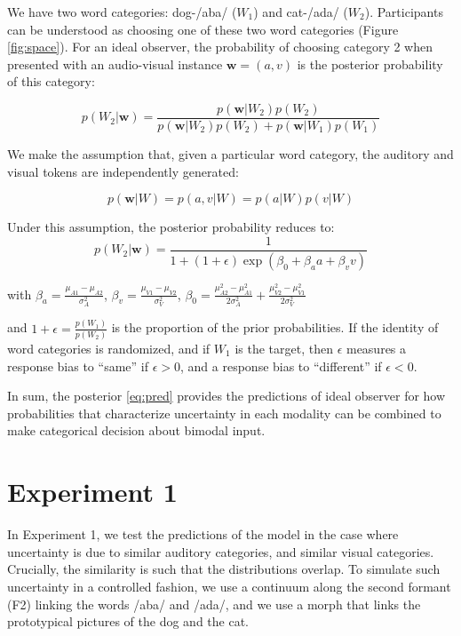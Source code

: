 \documentclass[10pt,letterpaper]{article}
\begin{document}
We have two word categories: dog-/aba/ ($W_1$) and cat-/ada/ ($W_2$). Participants can be understood as choosing one of these two word categories (Figure \ref{fig:space}). For an ideal observer, the probability of choosing category 2 when presented with an audio-visual instance $\mathbf{w}=(a,v)$ is the posterior probability of this category:

\begin{equation}
p(W_2 | \mathbf{w})=\frac{p(\mathbf{w}|W_2)p(W_2)}{p(\mathbf{w}|W_2)p(W_2)+p(\mathbf{w}|W_1)p(W_1)}
\end{equation}

We make the assumption that, given a particular word category, the auditory and visual tokens are independently generated:

\begin{equation}
p(\mathbf{w} | W) = p(a,v| W) = p(a| W)p(v| W)
\end{equation}

Under this assumption, the posterior probability reduces to:
\begin{equation}
p(W_2 | \mathbf{w})=\frac{1}{1+(1+\epsilon)\exp(\beta_0+\beta_aa+\beta_vv)}
\label{eq:pred}
\end{equation}

 with $\beta_a=\frac{\mu_{A1}-\mu_{A2}}{\sigma^2_{A}}$,
$\beta_v=\frac{\mu_{V1}-\mu_{V2}}{\sigma^2_{V}}$,
$\beta_0=\frac{\mu^2_{A2}-\mu^2_{A1}}{2\sigma^2_{A}}+\frac{\mu^2_{V2}-\mu^2_{V1}}{2\sigma^2_{V}}$

and $1+\epsilon=\frac{p(W_1)}{p(W_2)}$ is the proportion of the prior probabilities. If the identity of word categories is randomized, and if $W_1$ is the target, then $\epsilon$ measures a response bias to ``same'' if $\epsilon > 0 $, and a response bias to ``different'' if $\epsilon < 0 $.

In sum, the posterior \ref{eq:pred} provides the predictions of ideal observer for how probabilities that characterize uncertainty in each modality can be combined to make categorical decision about bimodal input.


\section{Experiment 1}

In Experiment 1, we test the predictions of the model in the case where uncertainty is due to similar auditory categories, and similar visual categories. Crucially, the similarity is such that the distributions overlap. To simulate such uncertainty in a controlled fashion, we use a continuum along the second formant (F2) linking the words /aba/ and /ada/, and we use a morph that links the prototypical pictures of the dog and the cat.
\end{document}
